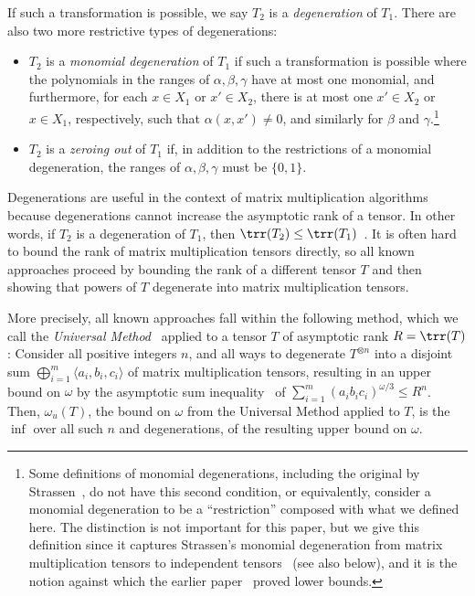\documentclass{toc}
\begin{document}
If such a transformation is possible, we say $T_2$ is a \emph{degeneration} of $T_1$. There are also two more restrictive types of degenerations:
\begin{itemize}
\item $T_2$ is a \emph{monomial degeneration} of $T_1$ if such a transformation is possible where the polynomials in the ranges of $\alpha, \beta, \gamma$ have at most one monomial, and furthermore, for each $x \in X_1$ or $x' \in X_2$, there is at most one $x' \in X_2$ or $x \in X_1$, respectively, such that $\alpha(x,x') \neq 0$, and similarly for $\beta$ and $\gamma$.\footnote{Some definitions of monomial degenerations, including the original by Strassen~\cite{strassenlaser1}, do not have this second condition, or equivalently, consider a monomial degeneration to be a ``restriction'' composed with what we defined here. The distinction is not important for this paper, but we give this definition since it captures Strassen's monomial degeneration from matrix multiplication tensors to independent tensors~\cite{laser} (see also  below), and it is the notion
%
against which the earlier paper~\cite{aw} proved lower bounds.}  

    \item $T_2$ is a \emph{zeroing out} of $T_1$ if, in addition to the restrictions of a monomial degeneration, the ranges of $\alpha, \beta, \gamma$ must be $\{0,1\}$.
\end{itemize}

Degenerations are useful in the context of matrix multiplication algorithms because degenerations cannot increase the asymptotic rank of a tensor. In other words, if $T_2$ is a degeneration of $T_1$, then $\trr(T_2) \leq \trr(T_1)$~\cite{bini1980border}. It is often hard to bound the rank of matrix multiplication tensors directly, so all known approaches proceed by bounding the rank of a different tensor $T$ and then showing that powers of $T$ degenerate into matrix multiplication tensors.

More precisely, all known approaches fall within the following method, which we call the \emph{Universal Method}~\cite{aw} applied to a tensor $T$ of asymptotic rank $R = \trr(T)$: Consider all positive integers $n$, and all ways to degenerate $T^{\otimes n}$ into a disjoint sum $\bigoplus_{i=1}^m \langle a_i, b_i, c_i \rangle$ of matrix multiplication tensors, resulting in an upper bound on $\omega$ by the asymptotic sum inequality~\cite{Sch81} of $\sum_{i=1}^m (a_i b_i c_i)^{\omega/3} \leq R^n$. Then, $\omega_u(T)$, the bound on $\omega$ from the Universal Method applied to $T$, is the $\inf$ over all such $n$ and degenerations, of the resulting upper bound on $\omega$.
\end{document}
